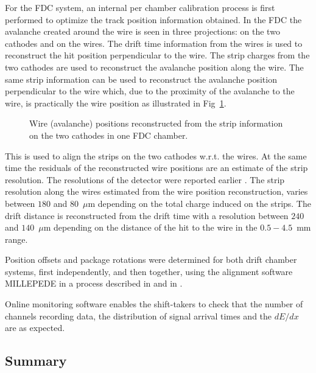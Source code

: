 For the FDC system, an internal per chamber calibration process is first performed to optimize the track position information obtained.  
In the FDC the avalanche created around the wire is seen in three projections: on the two cathodes and on the wires.
The drift time information from the wires is used to reconstruct the hit position perpendicular to the wire.
The strip charges from the two cathodes are used to reconstruct the avalanche position along the wire. 
The same strip information can be used to reconstruct the avalanche position perpendicular to the wire which, due to the proximity of the avalanche to the wire, is practically the wire position as illustrated in Fig~\ref{FDC_wires_from_strips}.
\begin{figure}[tbp]
\begin{center}
\caption{\label{FDC_wires_from_strips} Wire (avalanche) positions reconstructed from the strip information on the two cathodes in one FDC chamber.
}   
\end{center}  
\end{figure}
This is used to align the strips on the two cathodes w.r.t. the wires. 
At the same time the residuals of the reconstructed wire positions are an estimate of the strip resolution.
The resolutions of the detector were reported earlier \cite{FDC_NIM}. 
The strip resolution along the wires estimated from the wire position reconstruction, varies between $180$ and $80$~$\mu$m depending on the total charge induced on the strips. The drift distance is reconstructed from the drift time with a resolution between $240$ and $140$~$\mu$m
depending on the distance of the hit to the wire in the $0.5-4.5$~mm range.  

Position offsets and package rotations were determined for both drift chamber systems, first independently, and then together, using the alignment software MILLEPEDE\cite{millepede} in a process described in \cite{GlueXCDCNIM} and in \cite{MikeStaib_thesis}.

Online monitoring software enables the shift-takers to check that the number of channels recording data, the distribution of signal arrival times and the $dE/dx$ are as expected. 


\subsection{Summary \label{sec:dcsummary}}
 
 
